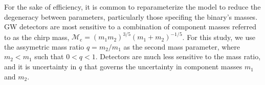 For the sake of efficiency, it is common to reparameterize the model to reduce the degeneracy between parameters, particularly those specifing the binary's masses.  GW detectors are most sensitive to a combination of component masses referred to as the chirp mass, $\mathcal{M}_\mathrm{c} = (m_1 m_2)^{3/5} (m_1 + m_2)^{-1/5}$.  For this study, we use the assymetric mass ratio $q = m_2/m_1$ as the second mass parameter, where $m_2 < m_1$ such that $0 < q < 1$.  Detectors are much less sensitive to the mass ratio, and it is uncertainty in $q$ that governs the uncertainty in component masses $m_1$ and $m_2$.